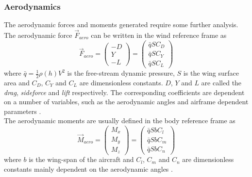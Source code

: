 \subsubsection{Aerodynamics}
The aerodynamic forces and moments generated require some further analysis. The aerodynamic
force $\vec{F}_{aero}$ can be written in the wind reference frame as
\begin{equation}
    \vec{F}_{aero}=
    \begin{pmatrix}
        -D \\
        Y \\
        -L
    \end{pmatrix}=
    \begin{pmatrix}
        \bar{q}SC_D \\
        \bar{q}SC_Y \\
        \bar{q}SC_L
    \end{pmatrix}
\end{equation}
where $\bar{q}=\frac{1}{2}\rho(h)V^2$ is the free-stream dynamic pressure, $S$ is the 
wing surface area and $C_D$, $C_Y$ and $C_L$ are dimensionless constants.
$D$, $Y$ and $L$ are called the \textit{drag}, \textit{sideforce} and \textit{lift} respectively. 
The corresponding coefficients are dependent on a number of variables, such as the aerodynamic angles
and airframe dependent parameters \cite{fighter_aircraft_mpc}.\\

The aerodynamic moments are usually defined in the body reference frame as
\begin{equation}\label{eq:dynamic_last}
    \vec{M}_{aero}=
    \begin{pmatrix}
        M_x \\
        M_y \\
        M_z
    \end{pmatrix}=
    \begin{pmatrix}
        \bar{q}SbC_l \\
        \bar{q}SbC_m \\
        \bar{q}SbC_n
    \end{pmatrix}
\end{equation}
where $b$ is the wing-span of the aircraft and $C_l$, $C_m$ and $C_n$ are dimensionless 
constants mainly dependent on the aerodynamic angles \cite{uav_dynamics_wind}. \\

